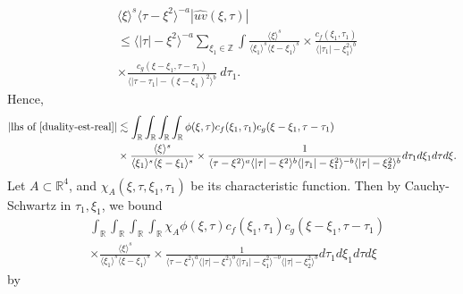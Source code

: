 \documentclass[12pt,reqno]{amsart}
\numberwithin{equation}{section}  %
\numberwithin{figure}{section}
\newcommand{\rr}{\mathbb{R}}
\newcommand{\zz}{\mathbb{Z}}
\newcommand{\wh}{\widehat}
\theoremstyle{plain}
\theoremstyle{definition}
\theoremstyle{remark}
\begin{document}
%
%
\begin{equation}
	\label{convo-est-starting-pnt-real}
	\begin{split}
		 & \langle \xi \rangle^s \langle \tau - \xi^{2} \rangle^{-a} | \wh{uv}\left( 
		\xi, \tau \right) |
		\\
		& \le \langle |\tau| - \xi^{2} \rangle^{-a}
		\sum_{\xi_1 \in \zz} \int \frac{\langle \xi \rangle^{s}}{\langle \xi_1 \rangle^s
    \langle \xi - \xi_1 \rangle^s} 
		\times \frac{c_f(\xi_1, \tau_1)}{\langle |\tau_1| - \xi_1^{2} \rangle ^{b}}
		\\
		& \times
		\frac{c_g(\xi - \xi_1, \tau - \tau_1 )}{\langle |\tau - \tau_1| - (\xi - \xi_1)^{2}
    \rangle^{b}}\ d \tau_1.
	\end{split}
\end{equation}
%
%
Hence, 
%
%
\begin{equation}
  \label{pre-fubini-int-form-real}
	\begin{split}
    |\text{lhs of} \ \eqref{duality-est-real}|
    & \lesssim \int_{\rr} \int_{\rr}     \int_{\rr}  \int_{\rr} \phi(\xi, \tau)
    c_f(\xi_1, \tau_1)
		c_g(\xi - \xi_1, \tau - \tau_1 )
		\\
    & \times \frac{\langle \xi \rangle ^{s}}{\langle \xi_{1} \rangle ^{s} \langle
    \xi-\xi_{1} \rangle ^{s}} \times \frac{1}{ \langle \tau - \xi^{2} \rangle^{a}
\langle |\tau| - \xi^{2} \rangle
    ^{b}\langle |\tau_{1}|-\xi_{1}^{2} \rangle ^{-b}\langle | \tau|-\xi_{2}^{2}
    \rangle ^{b}} d \tau_1 d \xi_{1} d \tau d \xi.
	\end{split}
\end{equation}
%
Let $A \subset \rr^{4}$, and $\chi_{A}(\xi, \tau, \xi_{1}, \tau_{1})$ be its
characteristic function. Then by Cauchy-Schwartz in
$\tau_{1}, \xi_{1}$, we bound
%
%
%
\begin{equation*}
\begin{split}
  & \int_{\rr} \int_{\rr}     \int_{\rr}  \int_{\rr} \chi_{A} \phi(\xi, \tau)
    c_f(\xi_1, \tau_1)
		c_g(\xi - \xi_1, \tau - \tau_1 )
		\\
    & \times \frac{\langle \xi \rangle ^{s}}{\langle \xi_{1} \rangle ^{s} \langle
    \xi-\xi_{1} \rangle ^{s}} \times \frac{1}{ \langle \tau - \xi^{2} \rangle^{a}
\langle |\tau| - \xi^{2} \rangle
    ^{b}\langle |\tau_{1}|-\xi_{1}^{2} \rangle ^{-b}\langle | \tau|-\xi_{2}^{2}
    \rangle ^{b}} d \tau_1 d \xi_{1} d \tau d \xi
\end{split}
\end{equation*}
%
%
by
%
%
\end{document}

